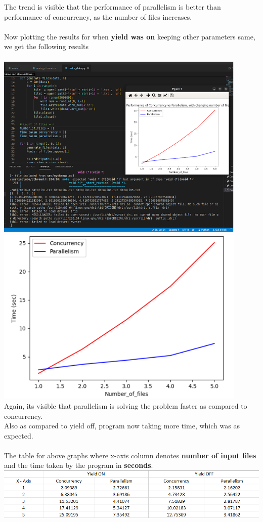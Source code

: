 \documentclass[12pt]{article}
\begin{document}
\begin{spacing}{1.2}
The trend is visible that the performance of parallelism is better than performance of concurrency, as the number of files increases.\\
\\
Now plotting the results for when \textbf{yield was on} keeping other parameters same, we get the following results\\
\\
\includegraphics[width=12cm]{images/32.png}\\
\includegraphics[width=12cm]{images/33.png}\\
Again, its visible that parallelism is solving the problem faster as compared to concurrency. \\
Also as compared to yield off, program now taking more time, which was as expected.\\
\\
The table for above graphs where x-axis column denotes \textbf{number of input files} and the time taken by the program in \textbf{seconds}. \\
\includegraphics[width=16cm]{images/image.png}\\


\end{spacing}
\end{document}
